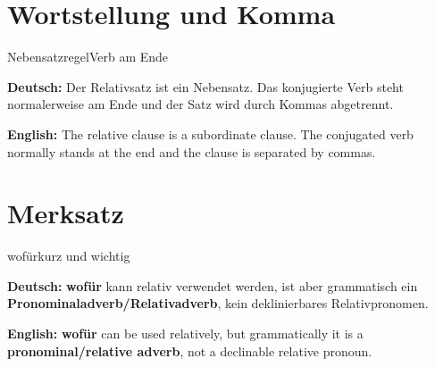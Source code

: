 \documentclass[a4paper,11pt]{article}
\newcommand{\GermanText}[1]{\textbf{Deutsch: }#1\par}
\newcommand{\EnglishText}[1]{{\small\color{SoftGray}\textbf{English: }#1\par}}
\begin{document}
\section{Wortstellung und Komma}

\begin{grammarentry}{Nebensatzregel}{Verb am Ende}

\GermanText{Der Relativsatz ist ein Nebensatz. Das konjugierte Verb steht normalerweise am Ende und der Satz wird durch Kommas abgetrennt.}

\EnglishText{The relative clause is a subordinate clause. The conjugated verb normally stands at the end and the clause is separated by commas.}

\end{grammarentry}

\section{Merksatz}

\begin{grammarentry}{wofür}{kurz und wichtig}

\GermanText{\textbf{wofür} kann relativ verwendet werden, ist aber grammatisch ein \textbf{Pronominaladverb/Relativadverb}, kein deklinierbares Relativpronomen.}

\EnglishText{\textbf{wofür} can be used relatively, but grammatically it is a \textbf{pronominal/relative adverb}, not a declinable relative pronoun.}

\end{grammarentry}
\end{document}

